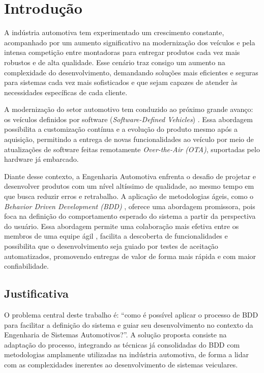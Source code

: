 \chapter{Introdução}

A indústria automotiva tem experimentado um crescimento constante, acompanhado por um aumento significativo na modernização dos veículos e pela intensa competição entre 
montadoras para entregar produtos cada vez mais robustos e de alta qualidade. Esse cenário traz consigo um aumento na complexidade do desenvolvimento, demandando soluções 
mais eficientes e seguras para sistemas cada vez mais sofisticados e que sejam capazes de atender às necessidades específicas de cada cliente.

A modernização do setor automotivo tem conduzido ao próximo grande avanço: os veículos definidos por software (\textit{Software-Defined Vehicles}) 
\cite{softwareVehicles2025}. Essa abordagem possibilita a customização contínua e a evolução do produto mesmo após a aquisição, permitindo a entrega de novas 
funcionalidades ao veículo por meio de atualizações de software feitas remotamente \textit{Over-the-Air (OTA)}, suportadas pelo hardware já embarcado.

Diante desse contexto, a Engenharia Automotiva enfrenta o desafio de projetar e desenvolver produtos com um nível altíssimo de qualidade, ao mesmo tempo em que busca reduzir 
erros e retrabalho. A aplicação de metodologias ágeis, como o \textit{Behavior Driven Development (BDD)} \cite{north2006bdd}, oferece uma abordagem promissora, pois foca na 
definição do comportamento esperado do sistema a partir da perspectiva do usuário. Essa abordagem permite uma colaboração mais efetiva entre os membros de uma equipe ágil 
\cite{atlassianAgileTeams}, facilita a descoberta de funcionalidades e possibilita que o desenvolvimento seja guiado por testes de aceitação automatizados, promovendo 
entregas de valor de forma mais rápida e com maior confiabilidade.

\section{\textbf{Justificativa}}

O problema central deste trabalho é: ``como é possível aplicar o processo de BDD para facilitar a definição do sistema e guiar seu desenvolvimento no contexto da 
Engenharia de Sistemas Automotivos?''. A solução proposta consiste na adaptação do processo, integrando as técnicas já consolidadas do BDD com metodologias 
amplamente utilizadas na indústria automotiva, de forma a lidar com as complexidades inerentes ao desenvolvimento de sistemas veiculares.

